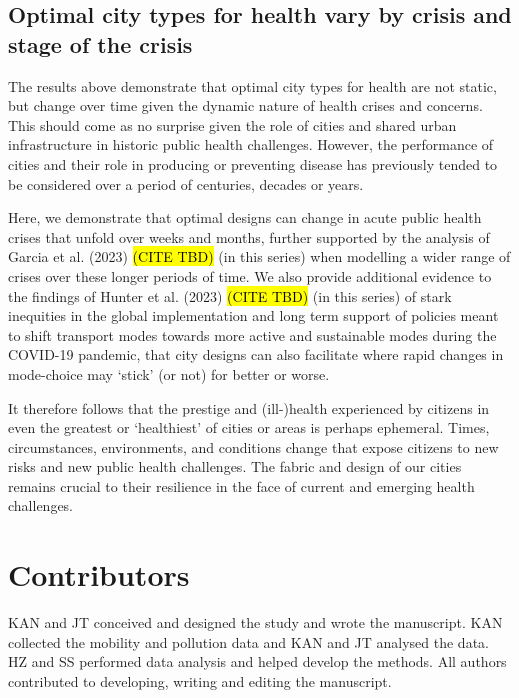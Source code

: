 \documentclass[preprint,10pt]{elsarticle} %
\begin{document}

\subsection*{Optimal city types for health vary by crisis and stage of the crisis}

The results above demonstrate that optimal city types for health are not static, but change over time given the dynamic nature of health crises and concerns. This should come as no surprise given the role of cities and shared urban infrastructure in historic public health challenges. However, the performance of cities and their role in producing or preventing disease has previously tended to be considered over a period of centuries, decades or years. 

Here, we demonstrate that optimal designs can change in acute public health crises that unfold over weeks and months, further supported by the analysis of Garcia et al. (2023) \hl{(CITE TBD)} (in this series) when modelling a wider range of crises over these longer periods of time. We also provide additional evidence to the findings of Hunter et al. (2023) \hl{(CITE TBD)} (in this series) of stark inequities in the global implementation and long term support of policies meant to shift transport modes towards more active and sustainable modes during the COVID-19 pandemic, that city designs can also facilitate where rapid changes in mode-choice may `stick' (or not) for better or worse. 

It therefore follows that the prestige and (ill-)health experienced by citizens in even the greatest or `healthiest' of cities or areas is perhaps ephemeral. Times, circumstances, environments, and conditions change that expose citizens to new risks and new public health challenges. The fabric and design of our cities remains crucial to their resilience in the face of current and emerging health challenges.


\section*{Contributors}\label{sec:credit}
KAN and JT conceived and designed the study and wrote the manuscript. KAN collected the mobility and pollution data and KAN and JT analysed the data. HZ and SS performed data analysis and helped develop the methods. All authors contributed to developing, writing and editing the manuscript.
\end{document}

